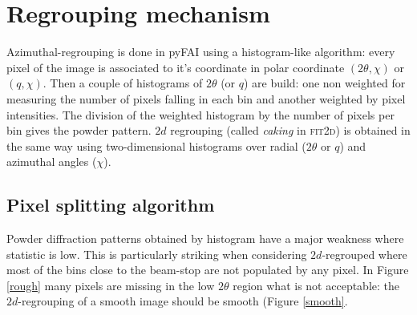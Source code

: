 \documentclass[a4paper]{jpconf}
\begin{document}
\section{Regrouping mechanism}
Azimuthal-regrouping is done in pyFAI using a histogram-like algorithm: every
pixel of the image is associated to it's coordinate in polar coordinate
$(2\theta , \chi )$ or $(q, \chi )$. Then a couple of histograms of $2\theta$
(or $q$) are build:
one non weighted for measuring the number of pixels falling in each bin and
another weighted by pixel intensities.
The division of the weighted histogram by the number of pixels per bin gives
the powder pattern.
$2d$ regrouping (called \textit{caking} in \textsc{fit2d}) is obtained in the
same way using two-dimensional histograms over radial ($2\theta$ or $q$) and azimuthal angles
($\chi$).

\subsection{Pixel splitting algorithm}
Powder diffraction patterns obtained by histogram have a major weakness where
statistic is low.
This is particularly striking when considering  $2d$-regrouped where most of
the bins close to the beam-stop are not populated by any pixel.
In Figure \ref{rough} many pixels are missing in the low $2\theta$ region
what is not acceptable: the  $2d$-regrouping of a smooth image should be smooth
(Figure \ref{smooth}.
\end{document}
